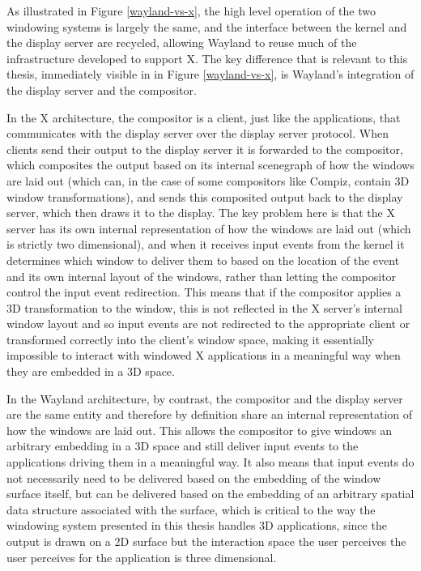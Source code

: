 As illustrated in Figure \ref{wayland-vs-x}, the high level operation of the two windowing systems is largely the same, and the interface between the kernel and the display server are recycled, allowing Wayland to reuse much of the infrastructure developed to support X. The key difference that is relevant to this thesis, immediately visible in in Figure \ref{wayland-vs-x}, is Wayland’s integration of the display server and the compositor. 

In the X architecture, the compositor is a client, just like the applications, that communicates with the display server over the display server protocol. When clients send their output to the display server it is forwarded to the compositor, which composites the output based on its internal scenegraph of how the windows are laid out (which can, in the case of some compositors like Compiz, contain 3D window transformations), and sends this composited output back to the display server, which then draws it to the display. The key problem here is that the X server has its own internal representation of how the windows are laid out (which is strictly two dimensional), and when it receives input events from the kernel it  determines which window to deliver them to based on the location of the event and its own internal layout of the windows, rather than letting the compositor control the input event redirection. This means that if the compositor applies a 3D transformation to the window, this is not reflected in the X server’s internal window layout and so input events are not redirected to the appropriate client or transformed correctly into the client’s window space, making it essentially impossible to interact with windowed X applications in a meaningful way when they are embedded in a 3D space. 

In the Wayland architecture, by contrast, the compositor and the display server are the same entity and therefore by definition share an internal representation of how the windows are laid out. This allows the compositor to give windows an arbitrary embedding in a 3D space and still deliver input events to the applications driving them in a meaningful way. It also means that input events do not necessarily need to be delivered based on the embedding of the window surface itself, but can be delivered based on the embedding of an arbitrary spatial data structure associated with the surface, which is critical to the way the windowing system presented in this thesis handles 3D applications, since the output is drawn on a 2D surface but the interaction space the user perceives the user perceives for the application is three dimensional.

